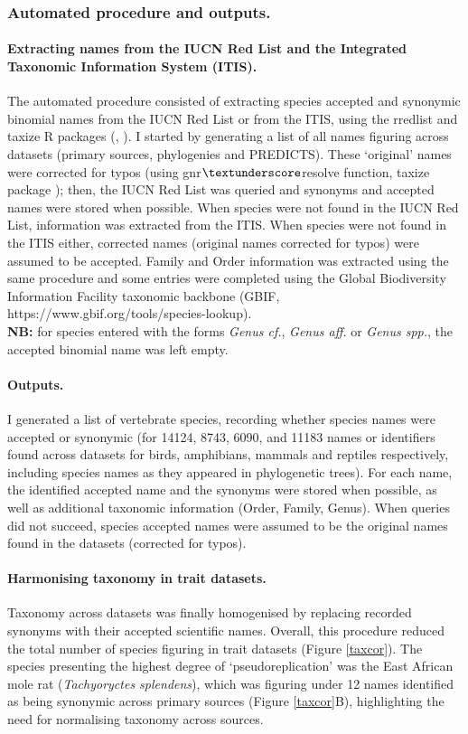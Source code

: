 \subsubsection{Automated procedure and outputs.}
\paragraph{Extracting names from the IUCN Red List and the Integrated Taxonomic Information System (ITIS).}
The automated procedure consisted of extracting species accepted and synonymic binomial names from the IUCN Red List or from the ITIS, using the rredlist and taxize R packages (\cite{rredlist}, \cite{Chamberlain2013}). I started by generating a list of all names figuring across datasets (primary sources, phylogenies and PREDICTS). These `original' names were corrected for typos (using gnr$\textunderscore$resolve function, taxize package \citep{Chamberlain2013}); then, the IUCN Red List was queried and synonyms and accepted names were stored when possible. When species were not found in the IUCN Red List, information was extracted from the ITIS. When species were not found in the ITIS either, corrected names (original names corrected for typos) were assumed to be accepted. Family and Order information was extracted using the same procedure and some entries were completed using the Global Biodiversity Information Facility taxonomic backbone (GBIF, https://www.gbif.org/tools/species-lookup).\\
\textbf{NB:} for species entered with the forms \textit{Genus cf.}, \textit{Genus aff.} or \textit{Genus spp.}, the accepted binomial name was left empty.

\paragraph{Outputs.} I generated a list of vertebrate species, recording whether species names were accepted or synonymic (for 14124, 8743, 6090, and 11183 names or identifiers found across datasets for birds, amphibians, mammals and reptiles respectively, including species names as they appeared in phylogenetic trees). For each name, the identified accepted name and the synonyms were stored when possible, as well as additional taxonomic information (Order, Family, Genus). When queries did not succeed, species accepted names were assumed to be the original names found in the datasets (corrected for typos).

\paragraph{Harmonising taxonomy in trait datasets.}
Taxonomy across datasets was finally homogenised by replacing recorded synonyms with their accepted scientific names. Overall, this procedure  reduced the total number of species figuring in trait datasets (Figure \ref{taxcor}). The species presenting the highest degree of `pseudoreplication' was the East African mole rat (\textit{Tachyoryctes splendens}), which was figuring under 12 names identified as being synonymic across primary sources (Figure \ref{taxcor}B), highlighting the need for normalising taxonomy across sources.

